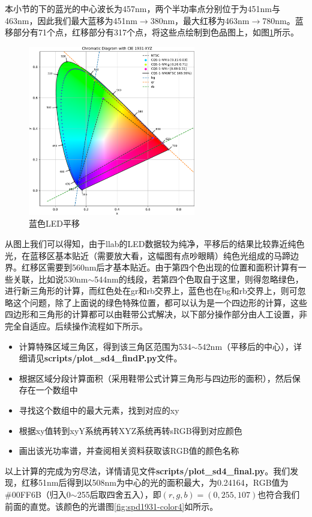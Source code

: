 本小节的下的蓝光的中心波长为457nm，两个半功率点分别位于为451nm与463nm，因此我们最大蓝移为451nm$\rightarrow$380nm，最大红移为463nm$\rightarrow$780nm。蓝移部分有71个点，红移部分有317个点，将这些点绘制到色品图上，如图\ref{fig:sd1931-BLUEMOVE}所示。

\begin{figure}[htbp]
    \centering
    \includegraphics[width=0.65\textwidth]{./imgs/sec5/CQS-1-NM-4.pdf}
    \caption{蓝色LED平移}
    \label{fig:sd1931-BLUEMOVE}
\end{figure}

从图上我们可以得知，由于llab的LED数据较为纯净，平移后的结果比较靠近纯色光，在蓝移区基本贴近（需要放大看，这幅图有点吵眼睛）纯色光组成的马蹄边界。红移区需要到560nm后才基本贴近。由于第四个色出现的位置和面积计算有一些关联，比如说530nm$\sim$544nm的线段，若第四个色取自于这里，则得忽略绿色，进行新三角形的计算，而红色处在gr和rb交界上，蓝色也在bg和rb交界上，则可忽略这个问题，除了上面说的绿色特殊位置，都可以认为是一个四边形的计算，这些四边形和三角形的计算都可以由鞋带公式解决，以下部分操作部分由人工设置，非完全自适应。后续操作流程如下所示。
\begin{itemize}
    \item [1. ]计算特殊区域三角区，得到该三角区范围为534$\sim$542nm（平移后的中心），详细请见{\bf scripts/plot\_sd4\_findP.py}文件。
    \item [2. ]根据区域分段计算面积（采用鞋带公式计算三角形与四边形的面积），然后保存在一个数组中
    \item [3. ]寻找这个数组中的最大元素，找到对应的xy
    \item [4. ]根据xy值转到xyY系统再转XYZ系统再转sRGB得到对应颜色
    \item [5. ]画出该光功率谱，并查阅相关资料获取该RGB值的颜色名称
\end{itemize}
以上计算的完成为穷尽法，详情请见文件{\bf scripts/plot\_sd4\_final.py}。我们发现，红移51nm后得到以508nm为中心的光的面积最大，为0.24164，RGB值为\#00FF6B（归入0$\sim$255后取四舍五入），即$(r,g,b)=(0,255,107)$也符合我们前面的直觉。该颜色的光谱图\ref{fig:spd1931-color4}如所示。

